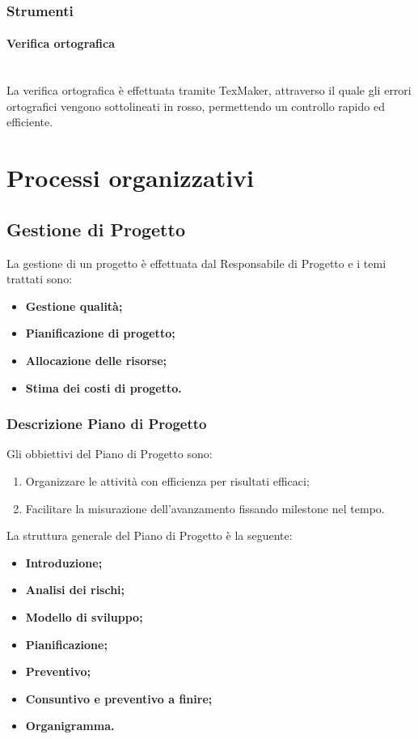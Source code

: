 \documentclass[11pt,a4paper]{article}
\begin{document}
\subsubsection{Strumenti}
\paragraph{Verifica ortografica}
\noindent \\
La verifica ortografica è effettuata tramite TexMaker, attraverso il quale gli errori ortografici vengono sottolineati in rosso, permettendo un controllo rapido ed efficiente.


\newpage
\section{Processi organizzativi}

\subsection{Gestione di Progetto}
La gestione di un progetto è effettuata dal Responsabile di Progetto e i temi trattati sono:
\begin{itemize}
\item \textbf{Gestione qualità;}
\item \textbf{Pianificazione di progetto;}
\item \textbf{Allocazione delle risorse;}
\item \textbf{Stima dei costi di progetto.}
\end{itemize}

\subsubsection{Descrizione Piano di Progetto}

Gli obbiettivi del Piano di Progetto sono:

\begin{enumerate}
\item Organizzare le attività con efficienza per risultati efficaci;
\item Facilitare la misurazione dell'avanzamento fissando milestone nel tempo.
\end{enumerate}

La struttura generale del Piano di Progetto è la seguente:
\begin{itemize}
\item \textbf{Introduzione;}
\item \textbf{Analisi dei rischi;}
\item \textbf{Modello di sviluppo;}
\item \textbf{Pianificazione;}
\item \textbf{Preventivo;}
\item \textbf{Consuntivo e preventivo a finire;}
\item \textbf{Organigramma.}
\end{itemize}
\end{document}

